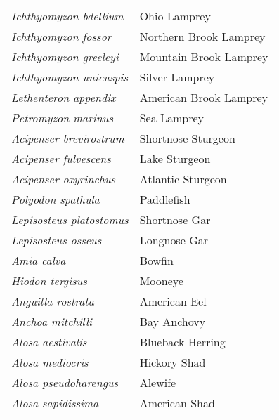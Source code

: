 \documentclass[11pt]{article}
\begin{document}
\thispagestyle{plain}

%

\textbf{\Student}

\begin{tabular}{@{}L{3in}L{3in}@{}}
\textit{Ichthyomyzon bdellium} & Ohio Lamprey\tabularnewline
\textit{Ichthyomyzon fossor} & Northern Brook Lamprey\tabularnewline
\textit{Ichthyomyzon greeleyi} & Mountain Brook Lamprey\tabularnewline
\textit{Ichthyomyzon unicuspis} & Silver Lamprey\tabularnewline
\textit{Lethenteron appendix} & American Brook Lamprey\tabularnewline
\textit{Petromyzon marinus} & Sea Lamprey\tabularnewline
\textit{Acipenser brevirostrum} & Shortnose Sturgeon\tabularnewline
\textit{Acipenser fulvescens} & Lake Sturgeon\tabularnewline
\textit{Acipenser oxyrinchus} & Atlantic Sturgeon\tabularnewline
\textit{Polyodon spathula} & Paddlefish\tabularnewline
\textit{Lepisosteus platostomus} & Shortnose Gar\tabularnewline
\textit{Lepisosteus osseus} & Longnose Gar\tabularnewline
\textit{Amia calva} & Bowfin\tabularnewline
\textit{Hiodon tergisus} & Mooneye\tabularnewline
\textit{Anguilla rostrata} & American Eel\tabularnewline
\textit{Anchoa mitchilli} & Bay Anchovy\tabularnewline
\textit{Alosa aestivalis} & Blueback Herring\tabularnewline
\textit{Alosa mediocris} & Hickory Shad\tabularnewline
\textit{Alosa pseudoharengus} & Alewife\tabularnewline
\textit{Alosa sapidissima} & American Shad\tabularnewline
\end{tabular}

\vspace{\baselineskip}

%
\textbf{\Student}
\end{document}

